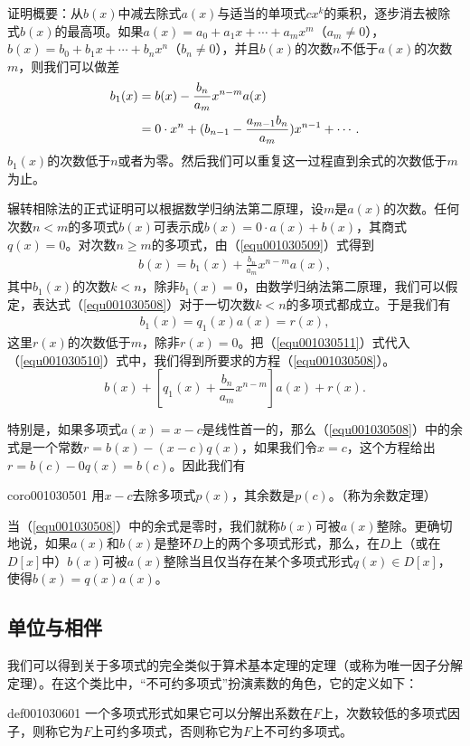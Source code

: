 证明概要：从$b(x)$中减去除式$a(x)$与适当的单项式$cx^k$的乘积，逐步消去被除式$b(x)$的最高项。如果$a(x)=a_0+a_1x+\cdots+a_mx^m$（$a_m \neq 0$），$b(x)=b_0+b_1x+\cdots+b_nx^n$（$b_n \neq 0$），并且$b(x)$的次数$n$不低于$a(x)$的次数$m$，则我们可以做差
\begin{align}
b_1(x) &= b(x) - \frac{b_n}{a_m}x^{n-m}a(x) \notag \\
&= 0 \cdot x^n + (b_{n-1} - \frac{a_{m-1}b_n}{a_m})x^{n-1} + \cdots. \label{equ001030509}
\end{align}
$b_1(x)$的次数低于$n$或者为零。然后我们可以重复这一过程直到余式的次数低于$m$为止。

辗转相除法的正式证明可以根据数学归纳法第二原理，设$m$是$a(x)$的次数。任何次数$n < m$的多项式$b(x)$可表示成$b(x)=0 \cdot a(x)+b(x)$，其商式$q(x)=0$。对次数$n \ge m$的多项式，由（\ref{equ001030509}）式得到
\begin{gather}\label{equ001030510}
b(x) = b_1(x) + \frac{b_n}{a_m}x^{n-m}a(x),
\end{gather}
其中$b_1(x)$的次数$k < n$，除非$b_1(x)=0$，由数学归纳法第二原理，我们可以假定，表达式（\ref{equ001030508}）对于一切次数$k<n$的多项式都成立。于是我们有
\begin{gather}\label{equ001030511}
b_1(x) = q_1(x)a(x) = r(x),
\end{gather}
这里$r(x)$的次数低于$m$，除非$r(x)=0$。把（\ref{equ001030511}）式代入（\ref{equ001030510}）式中，我们得到所要求的方程（\ref{equ001030508}）。
\[
b(x) + [q_1(x) + \frac{b_n}{a_m}x^{n-m}]a(x) + r(x).
\]

特别是，如果多项式$a(x)=x-c$是线性首一的，那么（\ref{equ001030508}）中的余式是一个常数$r = b(x) - (x-c)q(x)$，如果我们令$x = c$，这个方程给出$r = b(c) - 0q(x) = b(c)$。因此我们有
\begin{corollary}{}{coro001030501}
用$x-c$去除多项式$p(x)$，其余数是$p(c)$。（称为余数定理）
\end{corollary}

当（\ref{equ001030508}）中的余式是零时，我们就称$b(x)$可被$a(x)$整除。更确切地说，如果$a(x)$和$b(x)$是整环$D$上的两个多项式形式，那么，在$D$上（或在$D[x]$中）$b(x)$可被$a(x)$整除当且仅当存在某个多项式形式$q(x) \in D[x]$，使得$b(x)=q(x)a(x)$。


\subsection{单位与相伴}\label{subsection0010306}
我们可以得到关于多项式的完全类似于算术基本定理的定理（或称为唯一因子分解定理）。在这个类比中，“不可约多项式”扮演素数的角色，它的定义如下：
\begin{definition}{}{def001030601}
一个多项式形式如果它可以分解出系数在$F$上，次数较低的多项式因子，则称它为$F$上可约多项式，否则称它为$F$上不可约多项式。
\end{definition}

